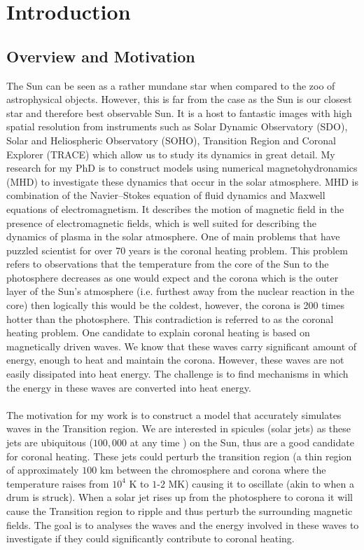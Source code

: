 \documentclass[12pt]{ociamthesis}
\newcommand{\np}{\\ \\}
\begin{document}
\chapter{Introduction}
\label{chap:intro}
\section{Overview and Motivation}
\label{sec:overview}
The Sun can be seen as a rather mundane star when compared to the zoo of astrophysical objects. However, this is far from the case as the Sun is our closest star and therefore best observable Sun. It is a host to fantastic images with high spatial resolution from instruments such as Solar Dynamic Observatory (SDO), Solar and Heliospheric Observatory (SOHO), Transition Region and Coronal Explorer (TRACE) which allow us to study its dynamics in great detail. My research for my PhD is to construct models using numerical magnetohydronamics (MHD) to investigate these dynamics that occur in the solar atmosphere. MHD is combination of the Navier$–$Stokes equation of fluid dynamics and Maxwell equations of electromagnetism. It describes the motion of magnetic field in the presence of electromagnetic fields, which is well suited for describing the dynamics of plasma in the solar atmosphere. One of main problems that have puzzled scientist for over 70 years is the coronal heating problem. This problem refers to observations that the temperature from the core of the Sun to the photosphere decreases as one would expect and the corona which is the outer layer of the Sun's atmosphere (i.e. furthest away from the nuclear reaction in the core) then logically this would be the coldest, however, the corona is 200 times hotter than the photosphere. This contradiction is referred to as the coronal heating problem. One candidate to explain coronal heating is based on magnetically driven waves. We know that these waves carry significant amount of energy, enough to heat and maintain the corona. However, these waves are not easily dissipated into heat energy. The challenge is to find mechanisms in which the energy in these waves are converted into heat energy.  \np
The motivation for my work is to construct a model that accurately simulates waves in the Transition region. We are interested in spicules (solar jets) as these jets are ubiquitous ($100,000$  at  any  time \citep{Beckers1968}) on the Sun, thus are a good candidate for coronal heating. These jets could perturb the transition region (a thin region of approximately $100$ km between the chromosphere and corona where the temperature raises from $10^4$ K to $1$-$2$ MK) causing it to oscillate (akin to when a drum is struck). When a solar jet rises up from the photosphere to corona it will cause the Transition region to ripple and thus perturb the surrounding magnetic fields. The goal is to analyses the waves and the energy involved in these waves to investigate if they could significantly contribute to coronal heating. \np
\end{document}
